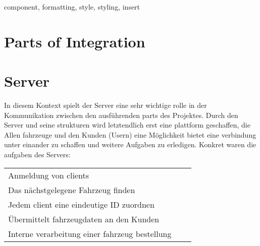 \documentclass[conference]{IEEEtran}
\begin{document}
\begin{IEEEkeywords}
component, formatting, style, styling, insert
\end{IEEEkeywords}

\newpage
\section{Parts of Integration}
\section{Server}
In diesem Kontext spielt der Server eine sehr wichtige rolle in der Kommunikation zwischen den ausführenden parts des Projektes. Durch den Server und seine strukturen wird letztendlich erst eine plattform geschaffen, die Allen fahrzeuge und den Kunden (Usern) eine Möglichkeit bietet eine verbindung  unter einander zu schaffen und weitere Aufgaben zu erledigen. Konkret waren die aufgaben des Servers: 
\begin{table}[h]
\begin{tabular}{lcr}
Anmeldung von clients\\
Das nächstgelegene Fahrzeug finden\\
Jedem client eine eindeutige ID zuordnen \\
Übermittelt fahrzeugdaten an den Kunden\\
Interne verarbeitung einer fahrzeug bestellung\\
\end{tabular}
\end{table}
\end{document}
